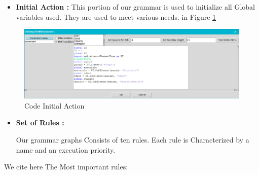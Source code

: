 \begin{itemize}
\item \textbf{Initial Action : } This portion of our grammar is used to initialize all
Global variables used. They are used to meet various needs.  in Figure \ref{fig:Code Initial Action} 

\end{itemize}

\begin{figure}[th]
	\centering  %
 	\includegraphics[scale=0.38]{ch3/img/InitAct}
	\caption{\label{fig:Code Initial Action}Code Initial Action}
\end{figure} 


\pagebreak
\begin{itemize}
\item \textbf{ Set of Rules : } 
 
Our grammar graphs Consists of ten rules. Each
rule is Characterized by a name and an execution priority. 

\end{itemize}
We cite here The Most important rules: 
